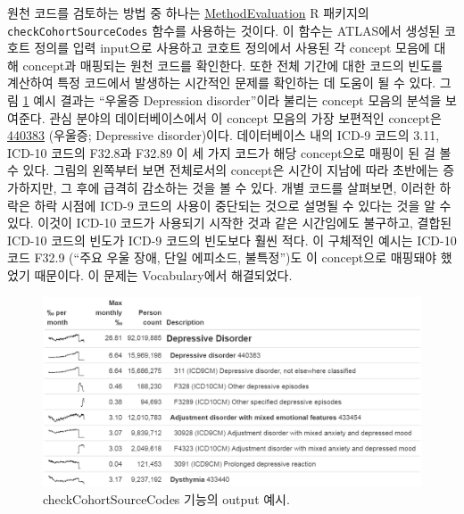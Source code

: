 \documentclass[10.5pt]{book}
\theoremstyle{definition}
\theoremstyle{definition}
\theoremstyle{definition}
\theoremstyle{remark}
\begin{document}
원천 코드를 검토하는 방법 중 하나는
\href{https://ohdsi.github.io/MethodEvaluation/}{MethodEvaluation} R
패키지의 \texttt{checkCohortSourceCodes} 함수를 사용하는 것이다. 이
함수는 ATLAS에서 생성된 코호트 정의를 입력 input으로 사용하고 코호트
정의에서 사용된 각 concept 모음에 대해 concept과 매핑되는 원천 코드를
확인한다. 또한 전체 기간에 대한 코드의 빈도를 계산하여 특정 코드에서
발생하는 시간적인 문제를 확인하는 데 도움이 될 수 있다. 그림
\ref{fig:sourceCodes} 예시 결과는 ``우울증 Depression disorder''이라
불리는 concept 모음의 분석을 보여준다. 관심 분야의 데이터베이스에서 이
concept 모음의 가장 보편적인 concept은
\href{http://athena.ohdsi.org/search-terms/terms/440383}{440383}
(우울증; Depressive disorder)이다. 데이터베이스 내의 ICD-9 코드의 3.11,
ICD-10 코드의 F32.8과 F32.89 이 세 가지 코드가 해당 concept으로 매핑이
된 걸 볼 수 있다. 그림의 왼쪽부터 보면 전체로서의 concept은 시간이
지남에 따라 초반에는 증가하지만, 그 후에 급격히 감소하는 것을 볼 수
있다. 개별 코드를 살펴보면, 이러한 하락은 하락 시점에 ICD-9 코드의
사용이 중단되는 것으로 설명될 수 있다는 것을 알 수 있다. 이것이 ICD-10
코드가 사용되기 시작한 것과 같은 시간임에도 불구하고, 결합된 ICD-10
코드의 빈도가 ICD-9 코드의 빈도보다 훨씬 적다. 이 구체적인 예시는 ICD-10
코드 F32.9 (``주요 우울 장애, 단일 에피소드, 불특정'')도 이 concept으로
매핑돼야 했었기 때문이다. 이 문제는 Vocabulary에서 해결되었다.

\begin{figure}

{\centering \includegraphics[width=1\linewidth]{images/DataQuality/sourceCodes} 

}

\caption{checkCohortSourceCodes 기능의 output 예시. }\label{fig:sourceCodes}
\end{figure}
\end{document}

